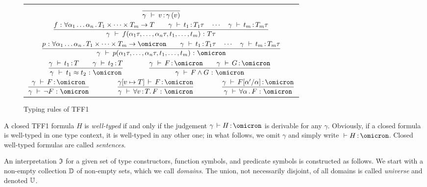 \begin{figure}
\begin{center}
\begin{tabular}{c@{\qquad\qquad}c}
\multicolumn{2}{c}{$\displaystyle
\frac{}{\gamma\, \:\vdash\: v \operatorname{:} \gamma\,(v)}$} \\[4ex]
\multicolumn{2}{c}{$\displaystyle
\frac{f \,\operatorname{:}\, \forall \alpha_1\dots\alpha_n \,.\,
    T_1 \times \dots \times T_m \to T
\qquad
\gamma\, \,\vdash\, t_1 \operatorname{:} T_1\tau
\quad\cdots\quad
\gamma\, \,\vdash\, t_m \operatorname{:} T_m\tau
}{\gamma\, \:\vdash\:
f(\alpha_1\tau,\dots,\alpha_n\tau,t_1,\dots,t_m) \,\operatorname{:}\, T\tau}
$} \\[4ex]
\multicolumn{2}{c}{$\displaystyle
\frac{p \,\ty\, \forall \alpha_1\dots\alpha_n \,.\,
    T_1 \times \dots \times T_m \to \omicron
\qquad
\gamma\, \,\vdash\, t_1 \ty T_1\tau
\quad\cdots\quad
\gamma\, \,\vdash\, t_m \ty T_m\tau
}{\gamma\, \:\vdash\:
p(\alpha_1\tau,\dots,\alpha_n\tau,t_1,\dots,t_m) \,\ty\, \omicron}
$} \\[4ex]
$\qquad\displaystyle
\frac{\gamma\, \,\vdash\, t_1 \ty T \qquad \gamma\, \,\vdash\, t_2 \ty T}{
\gamma\, \:\vdash\: t_1 \approx t_2 \,\ty\, \omicron}$ &
$\displaystyle
\frac{\gamma\, \,\vdash\, F \ty \omicron \qquad
\gamma\, \,\vdash\, G \ty \omicron}{
\gamma\, \,\vdash\, F \land G \,\ty\, \omicron}\qquad$ \\[4ex]
\multicolumn{2}{c}{
$\displaystyle
\frac{\gamma\, \,\vdash\, F \ty \omicron}{
\gamma\, \,\vdash\, \lnot F \,\ty\, \omicron}\qquad\qquad
\frac{\gamma[v \mapsto T] \,\vdash\, F \ty \omicron}{
\gamma\, \,\vdash\, \forall v \ty T .\, F \,\ty\, \omicron}\qquad\qquad
\frac{\gamma\, \,\vdash\, F[\alpha'/\alpha] \ty \omicron}{
\gamma\, \,\vdash\, \forall \alpha \,.\, F \,\ty\, \omicron}$}
\end{tabular}
\end{center}
\caption{Typing rules of TFF1}
\label{fig:typing}
\end{figure}

A closed TFF1 formula $H$ is {\em well-typed\/} if and only if
the judgement $\gamma\, \vdash H \ty \omicron$ is derivable
for any $\gamma$.
Obviously, if a closed formula is
well-typed in one type context, it is well-typed in any other one;
in what follows, we omit $\gamma$ and simply write
${} \vdash H \ty \omicron$.
Closed well-typed formulas are called {\em sentences}.

An interpretation $\mathfrak{I}$ for a given set of type constructors,
function symbols, and predicate symbols is constructed as follows.
We start with a non-empty collection $\mathbb{D}$ of non-empty sets,
which we call {\em domains}. The union, not necessarily disjoint,
of all domains is called {\em universe\/} and denoted $\mathbb{U}$.

